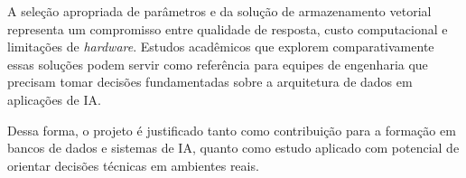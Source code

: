 A seleção apropriada de parâmetros e da solução de armazenamento vetorial representa um compromisso entre qualidade de resposta, custo computacional e limitações de \textit{hardware}. Estudos acadêmicos que explorem comparativamente essas soluções podem servir como referência para equipes de engenharia que precisam tomar decisões fundamentadas sobre a arquitetura de dados em aplicações de IA.

Dessa forma, o projeto é justificado tanto como contribuição para a formação em bancos de dados e sistemas de IA, quanto como estudo aplicado com potencial de orientar decisões técnicas em ambientes reais.
